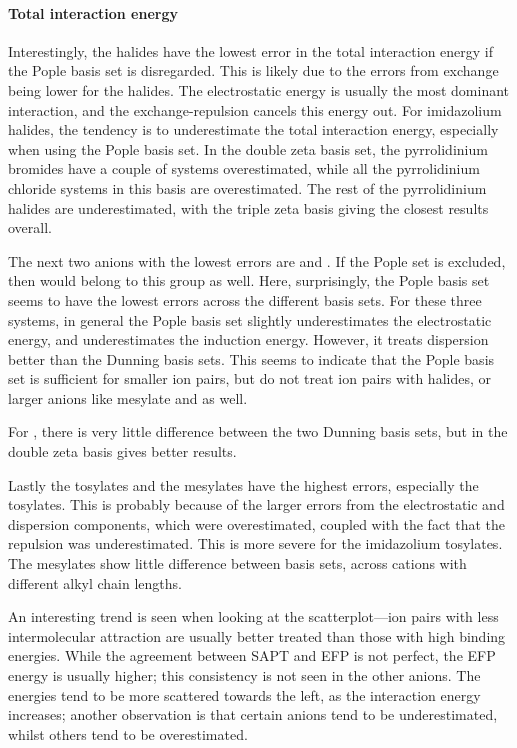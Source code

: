 \begin{multicols}{2}
\paragraph{Total interaction energy}
Interestingly, the halides have the lowest error in the total interaction energy if the Pople basis set is disregarded.
This is likely due to the errors from exchange being lower for the halides.
The electrostatic energy is usually the most dominant interaction, and the exchange-repulsion cancels this energy out.
For imidazolium halides, the tendency is to underestimate the total interaction energy, especially when using the Pople basis set.
In the double zeta basis set, the pyrrolidinium bromides have a couple of systems overestimated, while all the pyrrolidinium chloride systems in this basis are overestimated.
The rest of the pyrrolidinium halides are underestimated, with the triple zeta basis giving the closest results overall.


The next two anions with the lowest errors are \dca and \bfl. 
If the Pople set is excluded, then \pf would belong to this group as well.
Here, surprisingly, the Pople basis set seems to have the lowest errors across the different basis sets.
For these three systems, in general the Pople basis set slightly underestimates the electrostatic energy, and underestimates the induction energy.
However, it treats dispersion better than the Dunning basis sets.
This seems to indicate that the Pople basis set is sufficient for smaller ion pairs, but do not treat ion pairs with halides, or larger anions like mesylate and \ntf as well.


For , there is very little difference between the two Dunning basis sets, but in  the double zeta basis gives better results. 


Lastly the tosylates and the mesylates have the highest errors, especially the tosylates. 
This is probably because of the larger errors from the electrostatic and dispersion components, which were overestimated, coupled with the fact that the repulsion was underestimated. 
This is more severe for the imidazolium tosylates.
The mesylates show little difference between basis sets, across cations with different alkyl chain lengths.


An interesting trend is seen when looking at the scatterplot---ion pairs with less intermolecular attraction are usually better treated than those with high binding energies.
While the agreement between SAPT and EFP is not perfect, the EFP energy is usually higher; this consistency is not seen in the other anions.
The energies tend to be more scattered towards the left, as the interaction energy increases; another observation is that certain anions tend to be underestimated, whilst others tend to be overestimated.


\end{multicols}
